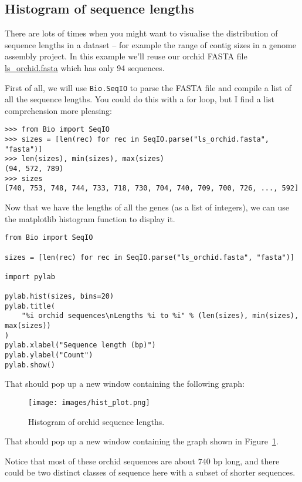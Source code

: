 \subsection{Histogram of sequence lengths}

There are lots of times when you might want to visualise the distribution of sequence
lengths in a dataset -- for example the range of contig sizes in a genome assembly
project.  In this example we'll reuse our orchid FASTA file
\href{https://raw.githubusercontent.com/biopython/biopython/master/Doc/examples/ls_orchid.fasta}{ls\_orchid.fasta}
which has only 94 sequences.

First of all, we will use \verb|Bio.SeqIO| to parse the FASTA file and compile a list
of all the sequence lengths.  You could do this with a for loop, but I find a list
comprehension more pleasing:

\begin{verbatim}
>>> from Bio import SeqIO
>>> sizes = [len(rec) for rec in SeqIO.parse("ls_orchid.fasta", "fasta")]
>>> len(sizes), min(sizes), max(sizes)
(94, 572, 789)
>>> sizes
[740, 753, 748, 744, 733, 718, 730, 704, 740, 709, 700, 726, ..., 592]
\end{verbatim}

Now that we have the lengths of all the genes (as a list of integers), we can use the
matplotlib histogram function to display it.

\begin{verbatim}
from Bio import SeqIO

sizes = [len(rec) for rec in SeqIO.parse("ls_orchid.fasta", "fasta")]

import pylab

pylab.hist(sizes, bins=20)
pylab.title(
    "%i orchid sequences\nLengths %i to %i" % (len(sizes), min(sizes), max(sizes))
)
pylab.xlabel("Sequence length (bp)")
pylab.ylabel("Count")
pylab.show()
\end{verbatim}

%
%
\begin{htmlonly}
\noindent That should pop up a new window containing the following graph:


\end{htmlonly}
%
%
\begin{latexonly}
\begin{figure}[htbp]
\centering
\texttt{[image: images/hist\_plot.png]}
\caption{Histogram of orchid sequence lengths.}
\label{fig:seq-len-hist}
\end{figure}
\noindent That should pop up a new window containing the graph
shown in Figure~\ref{fig:seq-len-hist}.
\end{latexonly}
%
%
Notice that most of these orchid sequences are about $740$ bp long, and there could be
two distinct classes of sequence here with a subset of shorter sequences.

